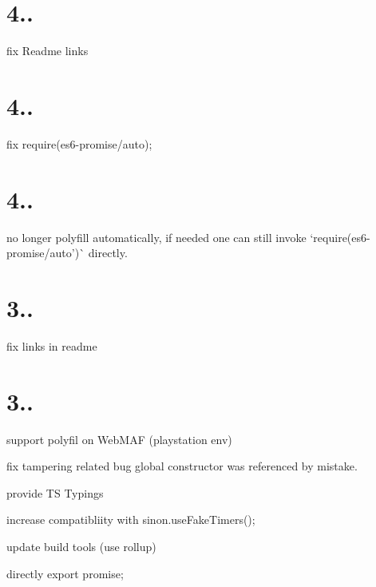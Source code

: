 \section*{4..}


\begin{DoxyItemize}
\item fix Readme links
\end{DoxyItemize}

\section*{4..}


\begin{DoxyItemize}
\item fix require(\textquotesingle{}es6-\/promise/auto\textquotesingle{});
\end{DoxyItemize}

\section*{4..}


\begin{DoxyItemize}
\item no longer polyfill automatically, if needed one can still invoke `require(\textquotesingle{}es6-\/promise/auto')\`{} directly.
\end{DoxyItemize}

\section*{3..}


\begin{DoxyItemize}
\item fix links in readme
\end{DoxyItemize}

\section*{3..}


\begin{DoxyItemize}
\item support polyfil on Web\+M\+AF (playstation env)
\item fix tampering related bug global {\ttfamily constructor} was referenced by mistake.
\item provide TS Typings
\item increase compatibliity with sinon.\+use\+Fake\+Timers();
\item update build tools (use rollup)
\item directly export promise;
\end{DoxyItemize}

